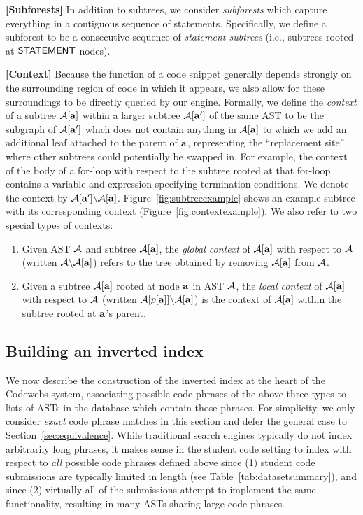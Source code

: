 \vspace{3mm}
{{\noindent \bf [Subforests]}} In addition to subtrees, we consider \emph{subforests} which capture everything in a contiguous sequence of statements.
Specifically, we define a subforest to be a consecutive sequence of \emph{statement subtrees} (i.e., 
subtrees rooted at ${\mathsf{STATEMENT}}$ nodes).  

\vspace{3mm}
{{\noindent \bf [Context]}} Because the function of a code snippet generally depends strongly on the surrounding region of code in which it appears,
we also allow for these surroundings to be directly queried by our engine. 
Formally, we define the \emph{context} of a subtree $\mathcal{A}[{\bf a}]$ within a larger subtree $\mathcal{A}[{\bf a}']$ of the same AST
to be the subgraph of $\mathcal{A}[{\bf a}']$ which does not contain anything in $\mathcal{A}[{\bf a}]$ to which we add an additional leaf attached to the parent of ${\bf a}$,
representing the ``replacement site'' where other subtrees could potentially be swapped in.
For example, the context of the body of a for-loop with respect to the subtree rooted at that for-loop contains a 
variable and expression specifying termination conditions.  We denote the context by $\mathcal{A}[{\bf a}']\backslash\mathcal{A}[{\bf a}]$.
Figure~\ref{fig:subtreeexample} shows an example subtree with its corresponding context (Figure~\ref{fig:contextexample}).
 We also refer to two special types of contexts:
\begin{enumerate}
\item Given AST $\mathcal{A}$  and subtree $\mathcal{A}[{\bf a}]$, 
the \emph{global context} of $\mathcal{A}[{\bf a}]$ with respect 
to $\mathcal{A}$ (written $\mathcal{A}\backslash\mathcal{A}[{\bf a}]$) refers to the tree obtained by removing $\mathcal{A}[{\bf a}]$ from $\mathcal{A}$.
\item Given a subtree $\mathcal{A}[{\bf a}]$ rooted at node ${\bf a}$ in AST $\mathcal{A}$, the \emph{local context} of $\mathcal{A}[{\bf a}]$ with respect to $\mathcal{A}$ (written $\mathcal{A}[p[{\bf a}]]\backslash\mathcal{A}[{\bf a}]$)
is the context of $\mathcal{A}[{\bf a}]$ within the subtree rooted at ${\bf a}$'s parent.
\end{enumerate}




\subsection{Building an inverted index}
We now describe the construction of the
inverted index at the heart of the Codewebs system, associating possible code 
phrases of the above three types to lists of ASTs in the database which contain those phrases.  For simplicity, 
we only consider \emph{exact} code phrase matches in this section and defer the general case to Section~\ref{sec:equivalence}.
While traditional search engines \cite{zobel06} typically do not index arbitrarily long phrases, it makes sense in the student code setting to index with respect to
\emph{all} possible code phrases defined above since (1) student code submissions are typically limited in length (see Table~\ref{tab:datasetsummary}), 
and since (2)  virtually all of the submissions attempt to implement the same functionality, resulting in many ASTs sharing large code phrases. 

